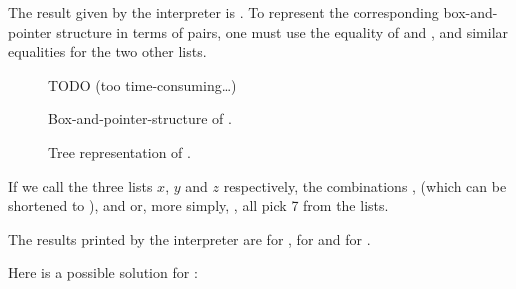 \begin{exe}[2.24]
    The result given by the interpreter is . To represent 
    the corresponding box-and-pointer structure in terms of pairs, one must use 
    the equality of  and
    , and similar equalities for 
    the two other lists.

    \begin{figure}
        \begin{center}
            TODO (too time-consuming…)
        \end{center}
        \caption{Box-and-pointer-structure of .}
    \end{figure}

    \vspace*{1cm}
    \begin{figure}
        \begin{center}
        \end{center}
        \caption{Tree representation of .}
    \end{figure}
\end{exe}

\begin{exe}[2.25]
    If we call the three lists $x$, $y$ and $z$ respectively, the combinations 
    ,  (which can be 
    shortened to ), and\linebreak
    or, more simply,
    ,
    all pick 7 from the lists.
\end{exe}

\begin{exe}[2.26]
    The results printed by the interpreter are  for
    ,  for  and
     for .
\end{exe}

\begin{exe}[2.27]
    Here is a possible solution for :
\end{exe}

